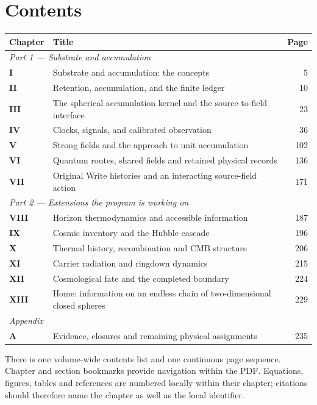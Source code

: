 \section*{Contents}
\noindent\begin{tabularx}{\textwidth}{@{}p{0.45in}Xr@{}}\toprule
\textbf{Chapter}&\textbf{Title}&\textbf{Page}\\\midrule
\multicolumn{3}{l}{\textit{Part 1 --- Substrate and accumulation}}\\[6pt]\textbf{I} & Substrate and accumulation: the concepts & 5\\[9pt]
\textbf{II} & Retention, accumulation, and the finite ledger & 10\\[9pt]
\textbf{III} & The spherical accumulation kernel and the source-to-field interface & 23\\[9pt]
\textbf{IV} & Clocks, signals, and calibrated observation & 36\\[9pt]
\textbf{V} & Strong fields and the approach to unit accumulation & 102\\[9pt]
\textbf{VI} & Quantum routes, shared fields and retained physical records & 136\\[9pt]
\textbf{VII} & Original Write histories and an interacting source-field action & 171\\[9pt]
\multicolumn{3}{l}{\textit{Part 2 --- Extensions the program is working on}}\\[6pt]\textbf{VIII} & Horizon thermodynamics and accessible information & 187\\[9pt]
\textbf{IX} & Cosmic inventory and the Hubble cascade & 196\\[9pt]
\textbf{X} & Thermal history, recombination and CMB structure & 206\\[9pt]
\textbf{XI} & Carrier radiation and ringdown dynamics & 215\\[9pt]
\textbf{XII} & Cosmological fate and the completed boundary & 224\\[9pt]
\textbf{XIII} & Home: information on an endless chain of two-dimensional closed spheres & 229\\[9pt]
\multicolumn{3}{l}{\textit{Appendix}}\\[6pt]\textbf{A} & Evidence, closures and remaining physical assignments & 235\\[9pt]
\bottomrule\end{tabularx}
\vspace{0.2in}
\noindent There is one volume-wide contents list and one continuous page sequence. Chapter and section bookmarks provide navigation within the PDF. Equations, figures, tables and references are numbered locally within their chapter; citations should therefore name the chapter as well as the local identifier.
\clearpage
